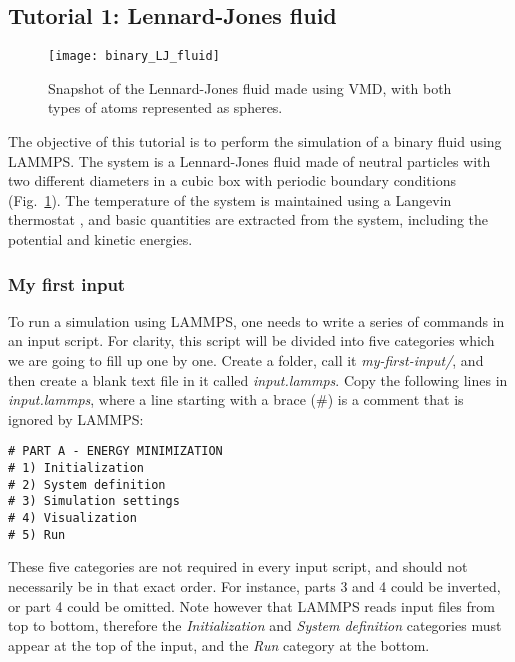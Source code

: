 \subsection{Tutorial 1: Lennard-Jones fluid}
\label{lennard-jones-label}

\begin{figure}
{\centering
\texttt{[image: binary\_LJ\_fluid]}
\caption{Snapshot of the Lennard-Jones fluid made using VMD, with both types of atoms represented as spheres.}}
\label{fig:binary_LJ_fluid}
\end{figure}

\noindent The objective of this tutorial is to perform the simulation of a binary fluid using LAMMPS. The system is a Lennard-Jones fluid made of neutral particles with two different diameters in a cubic box with periodic boundary conditions (Fig.~\ref{fig:binary_LJ_fluid}). The temperature of the system is maintained using a Langevin thermostat \cite{schneider1978molecular}, and basic quantities are extracted from the system, including the potential and kinetic energies. 

\subsubsection{My first input}

\noindent To run a simulation using LAMMPS, one needs to write a series of commands in an input script. For clarity, this script will be divided into five categories which we are going to fill up one by one. Create a folder, call it \textit{my-first-input/}, and then create a blank text file in it called \textit{input.lammps}. Copy the following lines in \textit{input.lammps}, where a line starting with a brace ($\#$) is a comment that is ignored by LAMMPS:
{\small  \begin{verbatim}
# PART A - ENERGY MINIMIZATION
# 1) Initialization
# 2) System definition
# 3) Simulation settings
# 4) Visualization
# 5) Run
\end{verbatim}}
\noindent These five categories are not required in every input script, and should not necessarily be in that exact order. For instance, parts 3 and 4 could be inverted, or part 4 could be omitted. Note however that LAMMPS reads input files from top to bottom, therefore the \textit{Initialization} and \textit{System definition} categories must appear at the top of the input, and the \textit{Run} category at the bottom.

